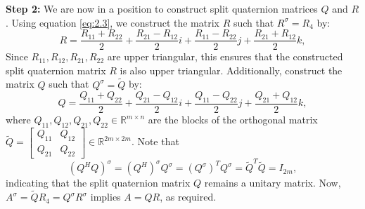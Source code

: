 \documentclass[conference]{IEEEtran}
\numberwithin{equation}{section}
\begin{document}
\noindent \textbf{Step 2:} We are now in a position to construct split quaternion matrices $Q$ and $R$.
Using equation \eqref{eq:2.3}, we construct the matrix $R$ such that $R^\sigma=R_4$ by:
\begin{equation*}
R = \frac{R_{11} + R_{22}}{2} + \frac{R_{21} - R_{12}}{2}i + \frac{R_{11} - R_{22}}{2}j + \frac{R_{21} + R_{12}}{2}k,
\end{equation*}
Since $R_{11}, R_{12}, R_{21}, R_{22}$ are upper triangular, this ensures that the constructed split quaternion matrix $R$ is also upper triangular. Additionally, construct the matrix $Q$ such that $Q^\sigma=\widetilde{Q}$ by:
\begin{equation*}
Q = \frac{Q_{11} + Q_{22}}{2} + \frac{Q_{21} - Q_{12}}{2}i + \frac{Q_{11} - Q_{22}}{2}j + \frac{Q_{21} + Q_{12}}{2}k,
\end{equation*}
where $Q_{11}, Q_{12}, Q_{21}, Q_{22} \in \mathbb{R}^{m \times n}$ are the blocks of the orthogonal matrix $\widetilde{Q} = \begin{bmatrix} Q_{11} & Q_{12} \\ Q_{21} & Q_{22} \end{bmatrix} \in \mathbb{R}^{2m \times 2m}$. Note that \[(Q^H Q)^\sigma = {(Q^H)}^\sigma Q^\sigma = {(Q^\sigma)}^TQ^\sigma = \widetilde{Q}^T\widetilde{Q} = I_{2m},\] indicating that the split quaternion matrix $Q$ remains a unitary matrix.
Now, $A^\sigma=\widetilde{Q}R_4=Q^\sigma R^\sigma$ implies
$A = Q R$, as required.
 
\end{document}
